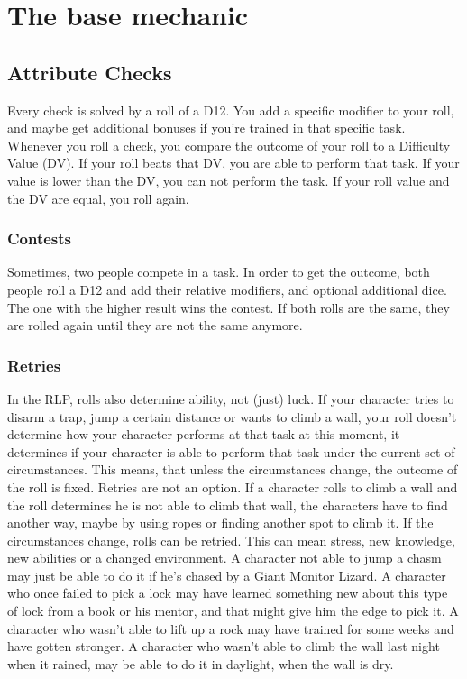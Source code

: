 \chapter{The base mechanic}
\section{Attribute Checks}
Every check is solved by a roll of a D12. You add a specific modifier to your roll, and maybe get additional bonuses if you’re trained in that specific task. Whenever you roll a check, you compare the outcome of your roll to a Difficulty Value (DV). If your roll beats that DV, you are able to perform that task. If your value is lower than the DV, you can not perform the task. If your roll value and the DV are equal, you roll again.

\subsection{Contests}
Sometimes, two people compete in a task. In order to get the outcome, both people roll a D12 and add their relative modifiers, and optional additional dice. The one with the higher result wins the contest. If both rolls are the same, they are rolled again until they are not the same anymore.

\subsection{Retries}
In the RLP, rolls also determine ability, not (just) luck. If your character tries to disarm a trap, jump a certain distance or wants to climb a wall, your roll doesn’t determine how your character performs at that task at this moment, it determines if your character is able to perform that task under the current set of circumstances. This means, that unless the circumstances change, the outcome of the roll is fixed. Retries are not an option. If a character rolls to climb a wall and the roll determines he is not able to climb that wall, the characters have to find another way, maybe by using ropes or finding another spot to climb it.
If the circumstances change, rolls can be retried. This can mean stress, new knowledge, new abilities or a changed environment.
A character not able to jump a chasm may just be able to do it if he’s chased by a Giant Monitor Lizard.
A character who once failed to pick a lock may have learned something new about this type of lock from a book or his mentor, and that might give him the edge to pick it.
A character who wasn’t able to lift up a rock may have trained for some weeks and have gotten stronger.
A character who wasn’t able to climb the wall last night when it rained, may be able to do it in daylight, when the wall is dry.

